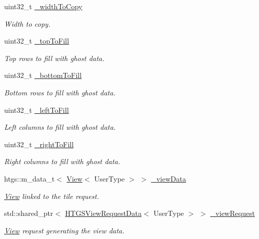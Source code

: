 \begin{DoxyCompactItemize}
uint32\+\_\+t \hyperlink{classfi_1_1HTGSTileRequestData_a1c0f08c75ace1bd3977a65f2b09e7994}{\+\_\+width\+To\+Copy}
\begin{DoxyCompactList}\small\item\em Width to copy. \end{DoxyCompactList}\item 
uint32\+\_\+t \hyperlink{classfi_1_1HTGSTileRequestData_a6ca656e5e3e81dd8f711a65bc68af414}{\+\_\+top\+To\+Fill}
\begin{DoxyCompactList}\small\item\em Top rows to fill with ghost data. \end{DoxyCompactList}\item 
uint32\+\_\+t \hyperlink{classfi_1_1HTGSTileRequestData_ad34befb6db36b5207ffbd4d3c1b4fffb}{\+\_\+bottom\+To\+Fill}
\begin{DoxyCompactList}\small\item\em Bottom rows to fill with ghost data. \end{DoxyCompactList}\item 
uint32\+\_\+t \hyperlink{classfi_1_1HTGSTileRequestData_a578001203e7c4ea6ceed05ca939ebbe1}{\+\_\+left\+To\+Fill}
\begin{DoxyCompactList}\small\item\em Left columns to fill with ghost data. \end{DoxyCompactList}\item 
uint32\+\_\+t \hyperlink{classfi_1_1HTGSTileRequestData_aa1ed6a475609fcca16251fc93e0b5cef}{\+\_\+right\+To\+Fill}
\begin{DoxyCompactList}\small\item\em Right columns to fill with ghost data. \end{DoxyCompactList}\item 
htgs\+::m\+\_\+data\+\_\+t$<$ \hyperlink{classfi_1_1View}{View}$<$ User\+Type $>$ $>$ \hyperlink{classfi_1_1HTGSTileRequestData_a53b78c667d486bd05e3c0afc1e0db5a5}{\+\_\+view\+Data}
\begin{DoxyCompactList}\small\item\em \hyperlink{classfi_1_1View}{View} linked to the tile request. \end{DoxyCompactList}\item 
std\+::shared\+\_\+ptr$<$ \hyperlink{classfi_1_1HTGSViewRequestData}{H\+T\+G\+S\+View\+Request\+Data}$<$ User\+Type $>$ $>$ \hyperlink{classfi_1_1HTGSTileRequestData_aaa91ef9b83ed81cdfb55df0d6297ca24}{\+\_\+view\+Request}
\begin{DoxyCompactList}\small\item\em \hyperlink{classfi_1_1View}{View} request generating the view data. \end{DoxyCompactList}\end{DoxyCompactItemize}
